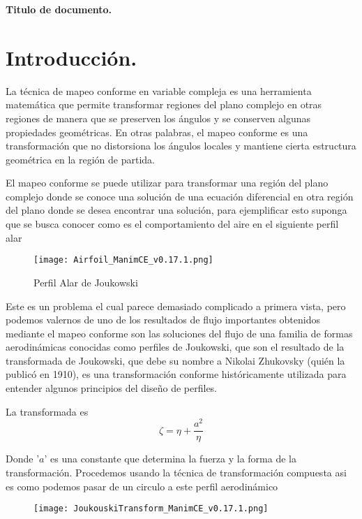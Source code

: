 \documentclass[12pt]{article}
\begin{document}
\newpage
\begin{center}
    \textbf{\Large Titulo de documento.}
    \end{center}

\section*{Introducción.}
	\noindent La técnica de mapeo conforme en variable compleja es una herramienta matemática que permite transformar regiones del plano complejo en otras regiones de manera que se preserven los ángulos y se conserven algunas propiedades geométricas. En otras palabras, el mapeo conforme es una transformación que no distorsiona los ángulos locales y mantiene cierta estructura geométrica en la región de partida.

	El mapeo conforme se puede utilizar para transformar una región del plano complejo donde se conoce una solución de una ecuación diferencial en otra región del plano donde se desea encontrar una solución, para ejemplificar esto suponga que se busca conocer como es el comportamiento del aire en el siguiente perfil alar

	\begin{figure}[!h]
		\begin{small}
			\begin{center}
				\texttt{[image: Airfoil\_ManimCE\_v0.17.1.png]}
			\end{center}
			\caption{Perfil Alar de Joukowski}
		\end{small}
	\end{figure}
	
	\noindent Este es un problema el cual parece demasiado complicado a primera vista, pero podemos valernos de uno de los resultados de flujo importantes obtenidos mediante el mapeo conforme son las soluciones del flujo de una familia de formas aerodinámicas conocidas como perfiles de Joukowski, que son el resultado de  la transformada de Joukowski, que debe su nombre a Nikolai Zhukovsky (quién la publicó en 1910), es una transformación conforme históricamente utilizada para entender algunos principios del diseño de perfiles.
	
	La transformada es
	\begin{equation}
		\zeta = \eta + \frac{a^2}{\eta}	
	\end{equation}
	
	\noindent Donde '$a$' es una constante que determina la fuerza y la forma de la transformación. Procedemos usando la técnica de transformación compuesta asi es como podemos pasar de un circulo a este perfil aerodinámico
	\begin{figure}[!h]
		\begin{small}
			\begin{center}
				\texttt{[image: JoukouskiTransform\_ManimCE\_v0.17.1.png]}
			\end{center}
			\caption{}
			\label{TransformacionCompuesta}
		\end{small}
	\end{figure}
	
\end{document}
